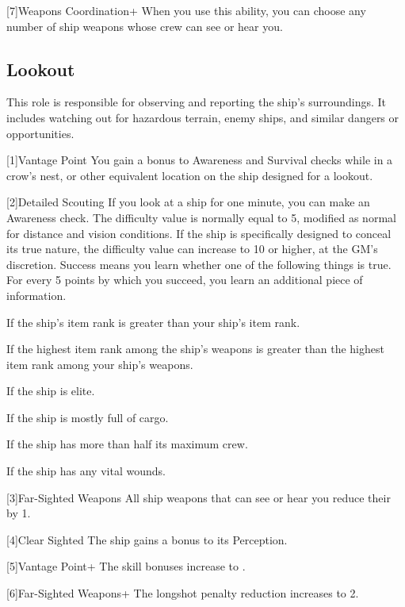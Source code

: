     [7]{Weapons Coordination+} When you use this ability, you can choose any number of ship weapons whose crew can see or hear you.

  \subsection{Lookout}
    This role is responsible for observing and reporting the ship's surroundings.
    It includes watching out for hazardous terrain, enemy ships, and similar dangers or opportunities.

    [1]{Vantage Point} You gain a  bonus to Awareness and Survival checks while in a crow's nest, or other equivalent location on the ship designed for a lookout.

    [2]{Detailed Scouting} If you look at a ship for one minute, you can make an Awareness check.
      The difficulty value is normally equal to 5, modified as normal for distance and vision conditions.
      If the ship is specifically designed to conceal its true nature, the difficulty value can increase to 10 or higher, at the GM's discretion.
      Success means you learn whether one of the following things is true.
      For every 5 points by which you succeed, you learn an additional piece of information.
      \begin{raggeditemize}
        \item If the ship's item rank is greater than your ship's item rank.
        \item If the highest item rank among the ship's weapons is greater than the highest item rank among your ship's weapons.
        \item If the ship is elite.
        \item If the ship is mostly full of cargo.
        \item If the ship has more than half its maximum crew.
        \item If the ship has any vital wounds.
      \end{raggeditemize}

    [3]{Far-Sighted Weapons} All ship weapons that can see or hear you reduce their  by 1.

    [4]{Clear Sighted} The ship gains a  bonus to its Perception.

    [5]{Vantage Point+} The skill bonuses increase to .

    [6]{Far-Sighted Weapons+} The longshot penalty reduction increases to 2.

